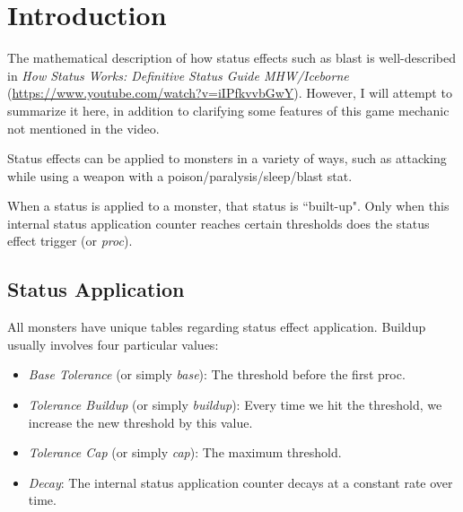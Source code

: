 \documentclass{article}
\begin{document}
\thispagestyle{plain}
\MakeCustomTitle
\bigskip



\begin{center}%
\begin{minipage}[c]{12cm}%
    \doclicenseThis%
\end{minipage}%
\end{center}%
\bigskip


\section{Introduction}%
\label{sec:introduction}

The mathematical description of how status effects such as blast is well-described in \textit{How Status Works: Definitive Status Guide MHW/Iceborne} (\href{link}{https://www.youtube.com/watch?v=iIPfkvvbGwY}). However, I will attempt to summarize it here, in addition to clarifying some features of this game mechanic not mentioned in the video.

Status effects can be applied to monsters in a variety of ways, such as attacking while using a weapon with a poison/paralysis/sleep/blast stat.

When a status is applied to a monster, that status is ``built-up". Only when this internal status application counter reaches certain thresholds does the status effect trigger (or \textit{proc}).

\subsection{Status Application}%
\label{sub:blast_application}

All monsters have unique tables regarding status effect application. Buildup usually involves four particular values:

\begin{itemize}
    \item \textit{Base Tolerance} (or simply \textit{base}): The threshold before the first proc.
    \item \textit{Tolerance Buildup} (or simply \textit{buildup}): Every time we hit the threshold, we increase the new threshold by this value.
    \item \textit{Tolerance Cap} (or simply \textit{cap}): The maximum threshold.
    \item \textit{Decay}: The internal status application counter decays at a constant rate over time.
\end{itemize}
\end{document}
